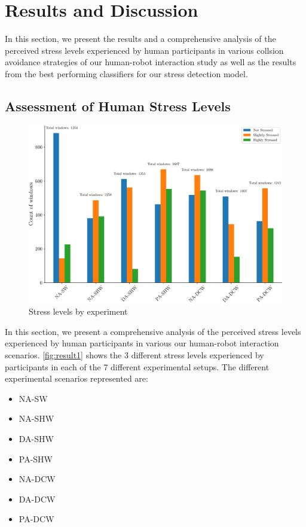 \chapter{Results and Discussion}


In this section, we present the results and a comprehensive analysis of the perceived stress levels experienced by human participants in various collsion avoidance strategies of our human-robot interaction study as well as the results from the best performing classifiers for our stress detection model.


\section{Assessment of Human Stress Levels}
\label{sec:result}


\begin{figure}[h]
	\centering
	\includegraphics[width=0.9\columnwidth]{images/stress_levels_by_experiment.pdf}
	\caption{Stress levels by experiment}
	\label{fig:result1}
\end{figure}

In this section, we present a comprehensive analysis of the perceived stress levels experienced by human participants in various our human-robot interaction scenarios. \autoref{fig:result1} shows the 3 different stress levels experienced by participants in each of the 7 different experimental setups.
The different experimental scenarios represented are:
\begin{itemize}
    \item{\gls{NA-SW}}
    \item{\gls{NA-SHW}}
    \item{\gls{DA-SHW}}
    \item{\gls{PA-SHW}}
    \item{\gls{NA-DCW}}
    \item{\gls{DA-DCW}}
    \item{\gls{PA-DCW}}
\end{itemize}


